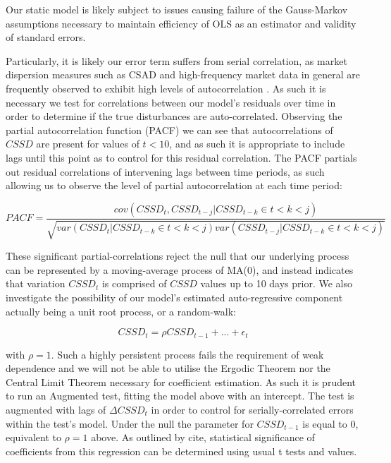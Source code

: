 \documentclass[12pt]{article}
\numberwithin{table}{section}   %
\begin{document}
Our static model is likely subject to issues causing failure of the Gauss-Markov assumptions necessary to maintain efficiency of OLS as an estimator and validity of standard errors. 

Particularly, it is likely our error term suffers from serial correlation, as market dispersion measures such as CSAD and high-frequency market data in general are frequently observed to exhibit high levels of autocorrelation \citep{cck}. As such it is necessary we test for correlations between our model’s residuals over time in order to determine if the true disturbances are auto-correlated. Observing the partial autocorrelation function (PACF) we can see that autocorrelations of $CSSD$ are present for values of $t<10$, and as such it is appropriate to include lags until this point as to control for this residual correlation. The PACF partials out residual correlations of intervening lags between time periods, as such allowing us to observe the level of partial autocorrelation at each time period:

$$
PACF=\frac{cov(CSSD_t,CSSD_{t-j}|CSSD_{t-k}\in{t<k<j})}{\sqrt{var(CSSD_t|CSSD_{t-k}\in{t<k<j})var(CSSD_{t-j}|CSSD_{t-k}\in{t<k<j})}}
$$

These significant partial-correlations reject the null that our underlying process can be represented by a moving-average process of MA(0), and instead indicates that variation $CSSD_t$ is comprised of $CSSD$ values up to 10 days prior. We also investigate the possibility of our model’s estimated auto-regressive component actually being a unit root process, or a random-walk:

$$
CSSD_t=\rho{CSSD_{t-1}}+...+\epsilon_t
$$

with $\rho=1$. Such a highly persistent process fails the requirement of weak dependence and we will not be able to utilise the Ergodic Theorem nor the Central Limit Theorem necessary for coefficient estimation. As such it is prudent to run an Augmented \citet{dfuller} test, fitting the model above with an intercept. The test is augmented with lags of $\Delta{CSSD_t}$ in order to control for serially-correlated errors within the test’s model. Under the null the parameter for $CSSD_{t-1}$ is equal to 0, equivalent to $\rho=1$ above. As outlined by cite, statistical significance of coefficients from this regression can be determined using usual t tests and values.
\end{document}
